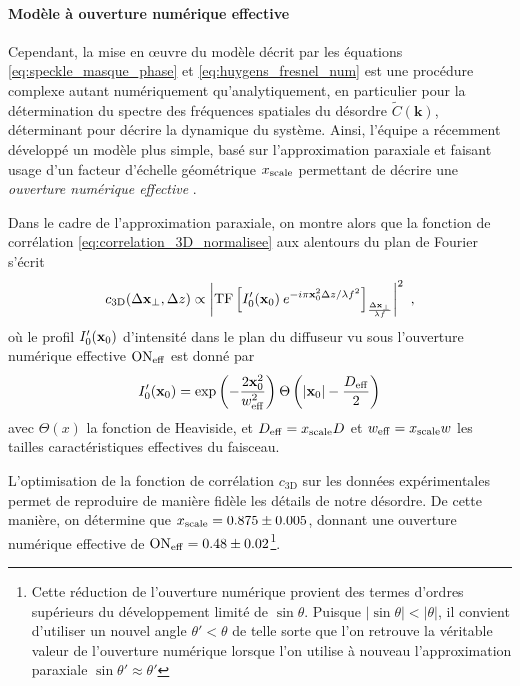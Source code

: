 \paragraph*{Modèle à ouverture numérique effective}
Cependant, la mise en œuvre du modèle décrit par les équations \ref{eq:speckle_masque_phase} et \ref{eq:huygens_fresnel_num} est une procédure complexe autant numériquement qu'analytiquement, en particulier pour la détermination du spectre des fréquences spatiales du désordre $\widetilde{C}(\mathbf{k})$, déterminant pour décrire la dynamique du système. Ainsi, l'équipe a récemment développé un modèle plus simple, basé sur l'approximation paraxiale et faisant usage d'un facteur d'échelle géométrique $x_{\mathrm{scale}}$ permettant de décrire une \emph{ouverture numérique effective} \citep{richard2019elastic}.

Dans le cadre de l'approximation paraxiale, on montre alors que la fonction de corrélation \ref{eq:correlation_3D_normalisee} aux alentours du plan de Fourier s'écrit
\begin{equation}
c_{\mathrm{3D}}(\Delta \mathbf{x}_\perp, \Delta z) \propto \left| \mathrm{TF} \left[ I_0'(\mathbf{x}_0) \: e^{-i \pi \mathbf{x}_0^2 \Delta z /\lambda f^2} \right]_{\frac{\Delta \mathbf{x}_\perp}{\lambda f}} \right|^2 \text{ ,}
\label{eq:correlation_3D_paraxial_effectif}
\end{equation}
où le profil $I_0'(\mathbf{x}_0)$ d'intensité dans le plan du diffuseur vu sous l'ouverture numérique effective $\mathrm{ON}_{\mathrm{eff}}$ est donné par
\begin{equation}
I_0'(\mathbf{x}_0)= \exp{\left( -\frac{2 \mathbf{x}_0^2}{w_{\mathrm{eff}}^2} \right)} \: \Theta \left( \left| \mathbf{x}_0 \right|- \frac{D_{\mathrm{eff}}}{2} \right)
\label{eq:profil_intensite_diffuseur}
\end{equation}
avec $\Theta(x)$ la fonction de Heaviside, et $D_{\mathrm{eff}}=x_{\mathrm{scale}} D$ et $w_{\mathrm{eff}}=x_{\mathrm{scale}} w$ les tailles caractéristiques effectives du faisceau. 

L'optimisation de la fonction de corrélation $c_{\mathrm{3D}}$ sur les données expérimentales permet de reproduire de manière fidèle les détails de notre désordre. De cette manière, on détermine que $x_{\mathrm{scale}}=0.875\pm0.005$, donnant une ouverture numérique effective de $\mathrm{ON}_{\mathrm{eff}}=0.48\pm0.02$\footnote{Cette réduction de l'ouverture numérique provient des termes d'ordres supérieurs du développement limité de $\sin{\theta}$. Puisque $\left| \sin{\theta} \right|<\left|\theta\right|$, il convient d'utiliser un nouvel angle $\theta'<\theta$ de telle sorte que l'on retrouve la véritable valeur de l'ouverture numérique lorsque l'on utilise à nouveau l'approximation paraxiale $\sin{\theta'} \approx \theta'$}.



